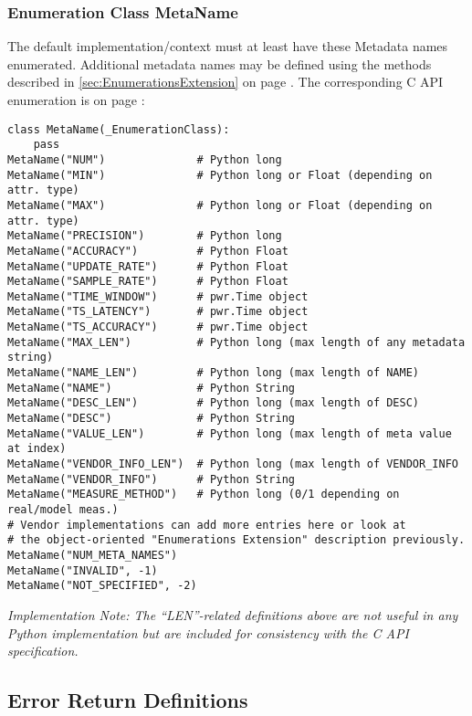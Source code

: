 \subsubsection{Enumeration Class MetaName}\label{class:MetaName}

The default implementation/context must at least have these Metadata names
enumerated. Additional metadata names may be defined using the methods
described in \ref{sec:EnumerationsExtension} on page
\pageref{sec:EnumerationsExtension}. The corresponding C API enumeration is on
page \pageref{type:MetaName}:


\begin{center}\begin{minipage}{.95\linewidth}\begin{lstlisting}
class MetaName(_EnumerationClass):
    pass
MetaName("NUM")              # Python long
MetaName("MIN")              # Python long or Float (depending on attr. type)
MetaName("MAX")              # Python long or Float (depending on attr. type)
MetaName("PRECISION")        # Python long
MetaName("ACCURACY")         # Python Float
MetaName("UPDATE_RATE")      # Python Float
MetaName("SAMPLE_RATE")      # Python Float
MetaName("TIME_WINDOW")      # pwr.Time object
MetaName("TS_LATENCY")       # pwr.Time object
MetaName("TS_ACCURACY")      # pwr.Time object
MetaName("MAX_LEN")          # Python long (max length of any metadata string)
MetaName("NAME_LEN")         # Python long (max length of NAME)
MetaName("NAME")             # Python String
MetaName("DESC_LEN")         # Python long (max length of DESC)
MetaName("DESC")             # Python String
MetaName("VALUE_LEN")        # Python long (max length of meta value at index)
MetaName("VENDOR_INFO_LEN")  # Python long (max length of VENDOR_INFO
MetaName("VENDOR_INFO")      # Python String
MetaName("MEASURE_METHOD")   # Python long (0/1 depending on real/model meas.)
# Vendor implementations can add more entries here or look at  
# the object-oriented "Enumerations Extension" description previously. 
MetaName("NUM_META_NAMES")
MetaName("INVALID", -1)
MetaName("NOT_SPECIFIED", -2)
\end{lstlisting}\end{minipage}\end{center}

\emph{Implementation Note: The ``LEN''-related definitions above are not
useful in any Python implementation but are included for consistency with the C API specification.}

\subsection{Error Return Definitions}\label{sec:PythonErrorReturnDefinition}

